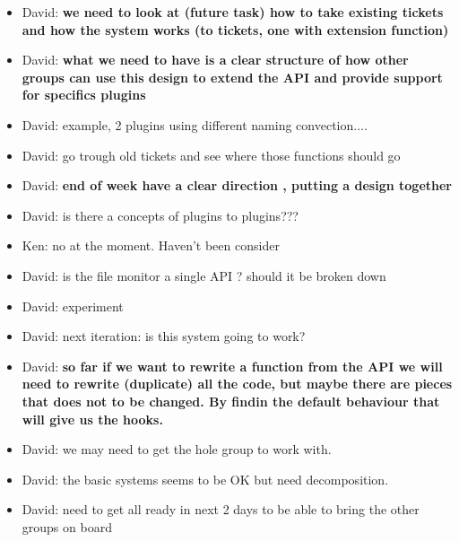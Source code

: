 \documentclass{letter}
\begin{document}
\begin{itemize}
 \item David: \textbf{we need to look at (future task) how to take existing tickets and how the system works (to tickets, one with extension function) }
 \item David: \textbf{what we need to have is a clear structure of how other groups can use this design to extend the API and provide support for specifics plugins}
 \item David: example, 2 plugins using different naming convection....
 \item David: go trough old tickets and see where those functions should go 
 \item David: \textbf{end of week have a clear direction , putting a design together}
 \item David: is there a concepts of plugins to plugins???
 \item Ken: no at the moment.  Haven't been consider
 \item David: is the file monitor a single API ?  should it be broken down
 \item David: experiment
 \item David: next iteration: is this system going to work?
 \item David: \textbf{so far if we want to rewrite a function from the API we will need to rewrite (duplicate) all the code, but maybe there are pieces that does not to be changed.  By findin the default behaviour that will give us the hooks.}
 \item David: we may need to get the hole group to work with.
 \item David: the basic systems seems to be OK but need decomposition.
 \item David: need to get all ready in next 2 days to be able to bring the other groups on board 
\end{itemize}
\end{document}
